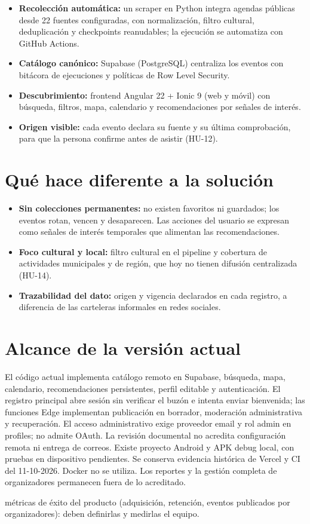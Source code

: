 \documentclass[11pt,a4paper]{article}
\begin{document}
\begin{itemize}
  \item \textbf{Recolección automática:} un scraper en Python integra agendas
        públicas desde 22 fuentes configuradas, con normalización, filtro cultural,
        deduplicación y checkpoints reanudables; la ejecución se automatiza con
        GitHub Actions.
  \item \textbf{Catálogo canónico:} Supabase (PostgreSQL) centraliza los eventos
        con bitácora de ejecuciones y políticas de Row Level Security.
  \item \textbf{Descubrimiento:} frontend Angular 22 + Ionic 9 (web y móvil) con
        búsqueda, filtros, mapa, calendario y recomendaciones por señales de
        interés.
  \item \textbf{Origen visible:} cada evento declara su fuente y su última
        comprobación, para que la persona confirme antes de asistir (HU-12).
\end{itemize}

\section{Qué hace diferente a la solución}

\begin{itemize}
  \item \textbf{Sin colecciones permanentes:} no existen favoritos ni guardados;
        los eventos rotan, vencen y desaparecen. Las acciones del usuario se
        expresan como señales de interés temporales que alimentan las
        recomendaciones.
  \item \textbf{Foco cultural y local:} filtro cultural en el pipeline y
        cobertura de actividades municipales y de región, que hoy no tienen
        difusión centralizada (HU-14).
  \item \textbf{Trazabilidad del dato:} origen y vigencia declarados en cada
        registro, a diferencia de las carteleras informales en redes sociales.
\end{itemize}

\section{Alcance de la versión actual}

El código actual implementa catálogo remoto en Supabase, búsqueda, mapa, calendario,
recomendaciones persistentes, perfil editable y autenticación. El registro principal
abre sesión sin verificar el buzón e intenta enviar bienvenida; las funciones Edge
implementan publicación en borrador, moderación administrativa y recuperación.
El acceso administrativo exige proveedor email y rol admin en profiles; no admite
OAuth. La revisión documental no acredita configuración remota ni entrega de correos.
Existe proyecto Android y APK debug local, con pruebas en dispositivo pendientes.
Se conserva evidencia histórica de Vercel y CI del 11-10-2026. Docker no se utiliza.
Los reportes y la gestión completa de organizadores permanecen fuera de lo acreditado.

\begin{pendienteenv}
métricas de éxito del producto (adquisición, retención, eventos publicados por
organizadores): deben definirlas y medirlas el equipo.
\end{pendienteenv}
\end{document}
